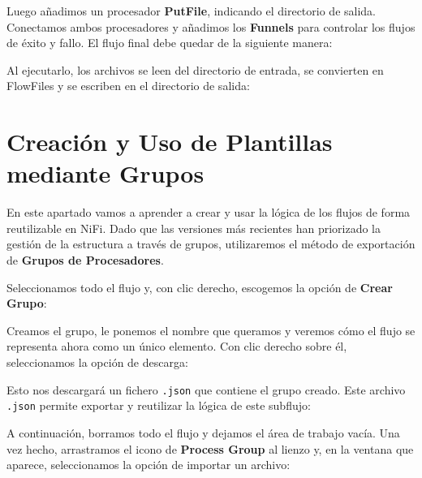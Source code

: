 \documentclass{../../../miPlantilla}
\begin{document}
Luego añadimos un procesador \textbf{PutFile}, indicando el directorio de salida. Conectamos ambos procesadores y añadimos los \textbf{Funnels} para controlar los flujos de éxito y fallo.
El flujo final debe quedar de la siguiente manera:


Al ejecutarlo, los archivos se leen del directorio de entrada, se convierten en FlowFiles y se escriben en el directorio de salida:


\newpage

\section{Creación y Uso de Plantillas mediante Grupos}
En este apartado vamos a aprender a crear y usar la lógica de los flujos de forma reutilizable en NiFi. Dado que las versiones más recientes han priorizado la gestión de la estructura a través de grupos, utilizaremos el método de exportación de \textbf{Grupos de Procesadores}.

Seleccionamos todo el flujo y, con clic derecho, escogemos la opción de \textbf{Crear Grupo}:


Creamos el grupo, le ponemos el nombre que queramos y veremos cómo el flujo se representa ahora como un único elemento. Con clic derecho sobre él, seleccionamos la opción de descarga:


\newpage

Esto nos descargará un fichero \texttt{.json} que contiene el grupo creado. Este archivo \texttt{.json} permite exportar y reutilizar la lógica de este subflujo:


A continuación, borramos todo el flujo y dejamos el área de trabajo vacía. Una vez hecho, arrastramos el icono de \textbf{Process Group} al lienzo y, en la ventana que aparece, seleccionamos la opción de importar un archivo:

\begin{figure}[H]
    \centering
    \begin{minipage}{0.1\textwidth}
    \end{minipage}\hfill
    \begin{minipage}{0.8\textwidth}
    \end{minipage}
\end{figure}
\end{document}
